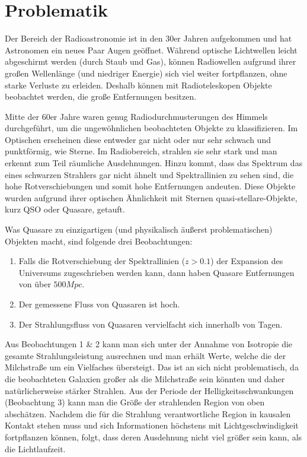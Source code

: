 
\section{Problematik}
Der Bereich der Radioastronomie ist in den 30er Jahren aufgekommen und hat Astronomen ein neues Paar Augen geöffnet. Während optische Lichtwellen leicht abgeschirmt werden (durch Staub und Gas), können Radiowellen aufgrund ihrer großen Wellenlänge (und niedriger Energie) sich viel weiter fortpflanzen, ohne starke Verluste zu erleiden. Deshalb können mit Radioteleskopen Objekte beobachtet werden, die große Entfernungen besitzen.

Mitte der 60er Jahre waren genug Radiodurchmusterungen des Himmels durchgeführt, um die ungewöhnlichen beobachteten Objekte zu klassifizieren. Im Optischen erscheinen diese entweder gar nicht oder nur sehr schwach und punktförmig, wie Sterne. Im Radiobereich, strahlen sie sehr stark und man erkennt zum Teil räumliche Ausdehnungen. Hinzu  kommt, dass das Spektrum das eines schwarzen Strahlers gar nicht ähnelt und Spektrallinien zu sehen sind, die hohe Rotverschiebungen und somit hohe Entfernungen andeuten. Diese Objekte wurden aufgrund ihrer optischen Ähnlichkeit mit Sternen quasi-stellare-Objekte, kurz QSO oder Quasare, getauft. 

Was Quasare zu einzigartigen (und physikalisch äußerst problematischen) Objekten macht, sind folgende drei Beobachtungen:
\begin{enumerate}
	\renewcommand{\labelenumi}{\arabic{enumi})}
	\item Falls die Rotverschiebung der Spektrallinien (\( z > 0.1\)) der Expansion des Universums zugeschrieben werden kann, dann haben Quasare Entfernungen von über \( 500 \unit{Mpc} \).
	\item Der gemessene Fluss von Quasaren ist hoch.
	\item Der Strahlungsfluss von Quasaren vervielfacht sich innerhalb von Tagen.
\end{enumerate}

Aus Beobachtungen 1 \& 2 kann man sich unter der Annahme von Isotropie die gesamte Strahlungsleistung ausrechnen und man erhält Werte, welche die der Milchstraße um ein Vielfaches übersteigt. Das ist an sich nicht problematisch, da die beobachteten Galaxien großer als die Milchstraße sein könnten und daher natürlicherweise stärker Strahlen. Aus der Periode der Helligkeitsschwankungen (Beobachtung 3) kann man die Größe der strahlenden Region von oben abschätzen. Nachdem die für die Strahlung verantwortliche Region in kausalen Kontakt stehen muss und sich Informationen höchstens mit Lichtgeschwindigkeit fortpflanzen können, folgt, dass deren Ausdehnung nicht viel größer sein kann, als die Lichtlaufzeit. \autocite{comins}

